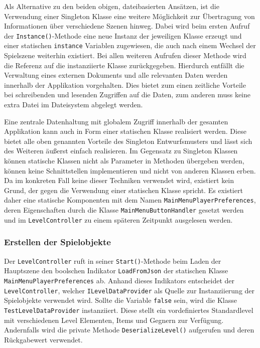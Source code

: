 Als Alternative zu den beiden obigen, dateibasierten Ansätzen, ist die Verwendung einer Singleton Klasse eine weitere Möglichkeit zur Übertragung von Informationen über verschiedene Szenen hinweg. Dabei wird beim ersten Aufruf der \texttt{Instance()}-Methode eine neue Instanz der jeweiligen Klasse erzeugt und einer statischen \texttt{instance} Variablen zugewiesen, die auch nach einem Wechsel der Spielszene weiterhin existiert. Bei allen weiteren Aufrufen dieser Methode wird die Referenz auf die instanziierte Klasse zurückgegeben. Hierdurch entfällt die Verwaltung eines externen Dokuments und alle relevanten Daten werden innerhalb der Applikation vorgehalten. Dies bietet zum einen zeitliche Vorteile bei schreibenden und lesenden Zugriffen auf die Daten, zum anderen muss keine extra Datei im Dateisystem abgelegt werden. 

Eine zentrale Datenhaltung mit globalem Zugriff innerhalb der gesamten Applikation kann auch in Form einer statischen Klasse realisiert werden. Diese bietet alle oben genannten Vorteile des Singleton Entwurfsmusters und lässt sich des Weiteren äußerst einfach realisieren. Im Gegensatz zu Singleton Klassen können statische Klassen nicht als Parameter in Methoden übergeben werden, können keine Schnittstellen implementieren und nicht von anderen Klassen erben. Da im konkreten Fall keine dieser Techniken verwendet wird, existiert kein Grund, der gegen die Verwendung einer statischen Klasse spricht. Es existiert daher eine statische Komponenten mit dem Namen \texttt{MainMenuPlayerPreferences}, deren Eigenschaften durch die Klasse \texttt{MainMenuButtonHandler} gesetzt werden und im \texttt{LevelController} zu einem späteren Zeitpunkt ausgelesen werden. 



%

\subsubsection{Erstellen der Spielobjekte}

Der \texttt{LevelController} ruft in seiner \texttt{Start()}-Methode beim Laden der Hauptszene den boolschen Indikator \texttt{LoadFromJson} der statischen Klasse \texttt{MainMenuPlayerPreferences} ab. Anhand dieses Indikators entscheidet der \texttt{LevelController}, welcher \texttt{ILevelDataProvider} als Quelle zur Instanziierung der Spielobjekte verwendet wird. Sollte die Variable \texttt{false} sein, wird die Klasse \texttt{TestLevelDataProvider} instanziiert. Diese stellt ein vordefiniertes Standardlevel mit verschiedenen Level Elementen, Items und Gegnern zur Verfügung. Andernfalls wird die private Methode \texttt{DeserializeLevel()} aufgerufen und deren Rückgabewert verwendet.

